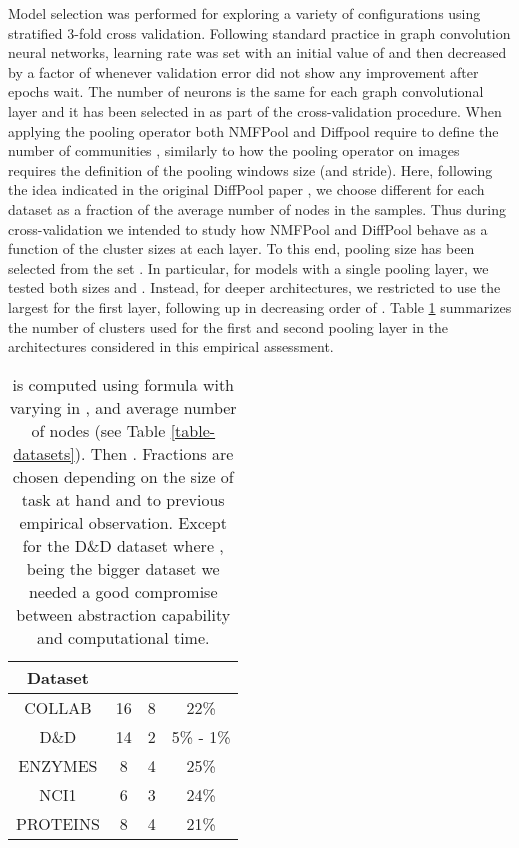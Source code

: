 \documentclass[runningheads]{llncs}
\begin{document}
Model selection was performed for exploring a variety of configurations using stratified 3-fold cross validation. Following standard practice in graph convolution neural networks, learning rate was set with an initial value of  and then decreased by a factor of  whenever validation error did not show any improvement after  epochs wait. The number of neurons is the same for each graph convolutional layer and it has been selected in  as part of the cross-validation procedure. When applying the pooling operator both NMFPool and Diffpool require to define the number of communities , similarly to how the pooling operator on images requires the definition of the pooling windows size (and stride). Here, following the idea indicated in the original DiffPool paper  \cite{NIPS2018_7729},  we choose different  for each dataset as a fraction of the average number of nodes in the samples. Thus during cross-validation we intended to study how NMFPool and DiffPool behave as a function of the cluster sizes  at each layer. To this end, pooling size has been selected from the set . In particular, for models with a single pooling layer, we tested both sizes  and .  Instead, for deeper architectures, we restricted to use the largest  for the first layer, following up in decreasing order of . Table \ref{table-fractions} summarizes the number of clusters used for the first and second pooling layer in the architectures considered in this empirical assessment.

\begin{table}
\centering
\caption{ is computed using formula  with  varying in , and  average number of nodes (see Table \ref{table-datasets}). Then . Fractions are chosen depending on the size of task at hand and to previous empirical observation. Except for the D\&D dataset where , being the bigger dataset we needed a good compromise between abstraction capability and computational time.}\label{table-fractions}
\begin{tabular}{cccc} \toprule[1.5pt]
    {\bfseries{Dataset}} & {\bfseries{}} & {\bfseries{}} & {\bfseries{}} \\ \midrule
    {COLLAB} & 16 & 8  & 22\% \\
    {D\&D} & 14 & 2  &  5\% - 1\% \\
    {ENZYMES} & 8 & 4 & 25\% \\
    {NCI1} & 6 & 3 & 24\% \\
    {PROTEINS} & 8 & 4 & 21\% \\ \bottomrule[1.5pt]
\end{tabular}
\end{table}
\end{document}
